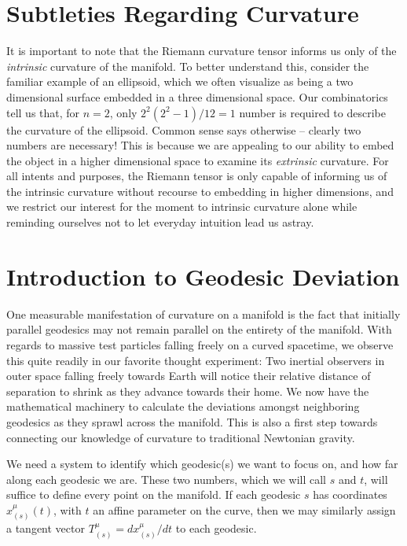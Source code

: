 \documentclass[10pt]{article}
\begin{document}
    \section{Subtleties Regarding Curvature}
    It is important to note that the Riemann curvature tensor informs us only of the \textit{intrinsic} curvature of the manifold. To better understand this, consider the familiar example of an ellipsoid, which we often visualize as being a two dimensional surface embedded in a three dimensional space. Our combinatorics tell us that, for $n=2$, only $2^2 (2^2-1) / 12=1$ number is required to describe the curvature of the ellipsoid. Common sense says otherwise -- clearly two numbers are necessary! This is because we are appealing to our ability to embed the object in a higher dimensional space to examine its \textit{extrinsic} curvature. For all intents and purposes, the Riemann tensor is only capable of informing us of the intrinsic curvature without recourse to embedding in higher dimensions, and we restrict our interest for the moment to intrinsic curvature alone while reminding ourselves not to let everyday intuition lead us astray. 

    \section{Introduction to Geodesic Deviation}
    One measurable manifestation of curvature on a manifold is the fact that initially parallel geodesics may not remain parallel on the entirety of the manifold. With regards to massive test particles falling freely on a curved spacetime, we observe this quite readily in our favorite thought experiment: Two inertial observers in outer space falling freely towards Earth will notice their relative distance of separation to shrink as they advance towards their home. We now have the mathematical machinery to calculate the deviations amongst neighboring geodesics as they sprawl across the manifold. This is also a first step towards connecting our knowledge of curvature to traditional Newtonian gravity. \\

    \par We need a system to identify which geodesic(s) we want to focus on, and how far along each geodesic we are. These two numbers, which we will call $s$ and $t$, will suffice to define every point on the manifold. If each geodesic $s$ has coordinates $x_{(s)}^{\mu}(t)$, with $t$ an affine parameter on the curve, then we may similarly assign a tangent vector $T_{(s)}^{\mu} = dx_{(s)}^{\mu}/dt$ to each geodesic. 
\end{document}
